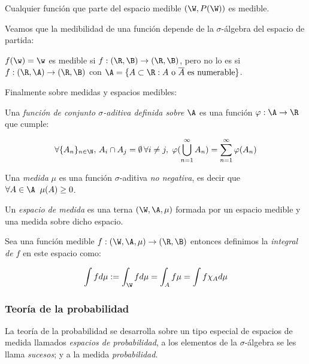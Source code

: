 \begin{nota}
  Cualquier función que parte del espacio medible $(\W, P(\W))$ es medible.
\end{nota}

Veamos que la medibilidad de una función depende de la $\sigma$-álgebra del espacio de partida:

\begin{ejemplo}
  $f(\w) = \w$ es medible si $f : (\R, \B) \to (\R, \B)$, pero no lo es si $f : (\R, \A) \to (\R, \B)$ con $\A = \{ A \subset \R : A \text{ o } \overline{A} \text{ es numerable} \}$.
\end{ejemplo}

Finalmente sobre medidas y espacios medibles:

\begin{ndef}
  Una \emph{función de conjunto $\sigma$-aditiva definida sobre $\A$} es una función $\varphi : \A \to \R$ que cumple:

  $$ \forall \{A_n\}_{n \in \N}, \, A_i \cap A_j = \emptyset \, \forall i \neq j, \; \varphi(\bigcup \limits^{\infty}_{n = 1} A_n) = \sum \limits^{\infty}_{n = 1} \varphi(A_n) $$
\end{ndef}

\begin{ndef}[Medida]
  Una \emph{medida} $\mu$ es una función $\sigma$-aditiva \emph{no negativa}, es decir que $\forall A \in \A \; \; \mu(A) \geq 0$.
\end{ndef}

\begin{ndef}
  Un \emph{espacio de medida} es una terna $(\W, \A, \mu)$ formada por un espacio medible y una medida sobre dicho espacio.
\end{ndef}

\begin{ndef}
  Sea una función medible $f: (\W, \A, \mu) \to (\R, \B)$ entonces definimos la \emph{integral de $f$} en este espacio como:

  $$\int f d\mu := \int_{\W} f d\mu = \int_A f \mu = \int f \chi_A d\mu$$
\end{ndef}

\subsubsection{Teoría de la probabilidad}
La teoría de la probabilidad se desarrolla sobre un tipo especial de espacios de medida llamados \emph{espacios de probabilidad}, a los elementos de la $\sigma$-álgebra se les llama \emph{sucesos}; y a la medida \emph{probabilidad}.

